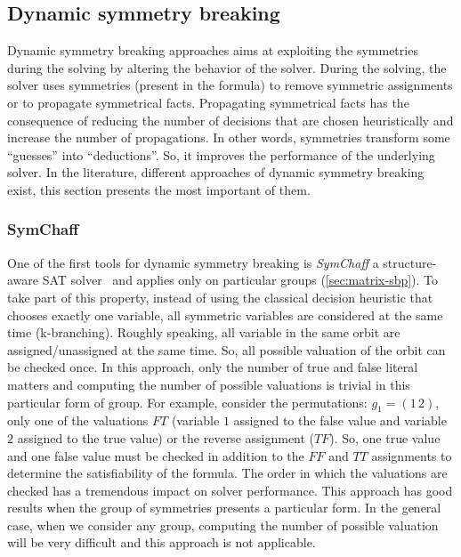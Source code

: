 %
%
%
%

% 

\subsection{Dynamic symmetry breaking}

Dynamic symmetry breaking approaches aims at exploiting the symmetries during the solving by altering the behavior of the solver.
During the solving, the solver uses symmetries (present in the formula) to remove symmetric assignments or to propagate symmetrical facts.
Propagating symmetrical facts has the consequence of reducing the number of decisions that are chosen heuristically and increase the number of propagations.
In other words, symmetries transform some “guesses” into “deductions”. So, it improves the performance of the underlying solver.
In the literature, different approaches of dynamic symmetry breaking exist, this section presents the most important of them.

\subsubsection{SymChaff}
One of the first tools for dynamic symmetry breaking is \emph{SymChaff} a structure-aware SAT solver~\cite{sabharwal2005symchaff}
and applies only on particular groups (\cref{sec:matrix-sbp}).
To take part of this property, instead of using the classical decision heuristic that chooses exactly one
variable, all symmetric variables are considered at the same time (k-branching). 
Roughly speaking, all variable in the same orbit are assigned/unassigned at the same time. So, all possible valuation 
of the orbit can be checked once. In this approach, only the number of true and false literal matters
and computing the number of possible valuations is trivial in this particular 
form of group. For example, consider the permutations: $g_1 = (1\, 2)$,
only one of the valuations $F T$ (variable $1$ assigned to the false value and variable $2$ assigned to the true value) or the reverse assignment ($T F$).
 So, one true value and one false value must be checked in addition to the 
$F F$ and $T T$ assignments to determine the satisfiability of the formula.
 The order in which the valuations are checked has a tremendous impact on solver performance. 
This approach has good results when the group of symmetries presents a particular form.
In the general case, when we consider any group, computing the number of possible valuation will be very difficult and this approach is not applicable.

